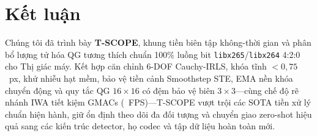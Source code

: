 \documentclass[journal]{IEEEtran}
\begin{document}
\section{Kết luận}
\label{sec:conclusion}

Chúng tôi đã trình bày \textbf{T-SCOPE}, khung tiền biên tập không-thời gian và phân bổ lượng tử hóa QG tương thích chuẩn 100\% luồng bit \texttt{libx265}/\texttt{libx264} 4:2:0 cho Thị giác máy. Kết hợp căn chỉnh 6-DOF Cauchy-IRLS, khóa tĩnh $<0{,}75$~px, khử nhiễu hạt mềm, bảo vệ tiền cảnh Smoothstep STE, EMA nền khóa chuyển động và quy tắc QG $16\times 16$ có đệm bảo vệ biên $3\times 3$---cùng chế độ rẽ nhánh IWA tiết kiệm \tscopeIwaAnalyticalGmacSaving{} GMACs (\tscopeIwaFps{}~FPS)---T-SCOPE vượt trội các SOTA tiền xử lý chuẩn hiện hành, giữ ổn định theo dõi đa đối tượng và chuyển giao zero-shot hiệu quả sang các kiến trúc detector, họ codec và tập dữ liệu hoàn toàn mới.



\end{document}
